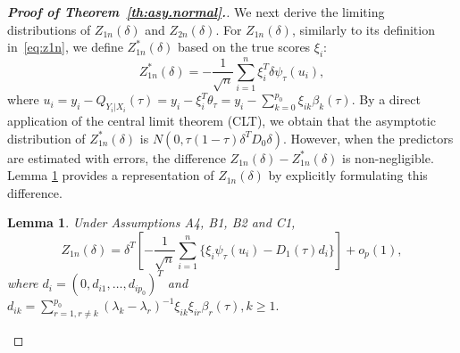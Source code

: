 \documentclass[times,sort&compress,3p]{elsarticle}
\theoremstyle{plain}%
\newtheorem{lemma}{Lemma}
\theoremstyle{definition}
\newcommand{\bD}{{D}}
\newcommand{\btheta}{{\theta}}
\newcommand{\bxi}{{\xi}}
\begin{document}
\begin{proof}[\textbf{\upshape Proof of Theorem~\ref{th:asy.normal}.}]
We next derive the limiting distributions of $Z_{1n}({\delta})$ and $Z_{2n}({\delta})$. For $Z_{1n}({\delta})$, similarly to its definition in~\eqref{eq:z1n}, we   
define $Z_{1n}^{*}({\delta})$ based on the true scores $\bxi_{i}$: 
\begin{equation}
\label{eq:z1n.star}
Z_{1n}^*({\delta}) = -\frac{1}{\sqrt{n}} \sum_{i = 1}^n \bxi_{i}^T {\delta} \psi_\tau({u}_i),
\end{equation}
where $u_ i = y_i - Q_{Y_i|X_i}(\tau) =  y_i - \bxi_{i}^T \btheta_{\tau} = y_i - \sum_{k = 0}^{p_0} \xi_{ik} \beta_k(\tau)$. 
By a direct application of the central limit theorem (CLT), we obtain that the asymptotic distribution of $Z_{1n}^*({\delta})$ is $N(0, \tau (1 - \tau) \delta^T D_0 \delta )$. However, when the predictors are estimated with errors, the difference $Z_{1n}({\delta}) - Z_{1n}^*({\delta})$ is non-negligible. Lemma \ref{th:z1n.represent} provides a representation of $Z_{1n}({\delta})$ by explicitly formulating this difference.
\begin{lemma}
	\label{th:z1n.represent}
	Under Assumptions A4, B1, B2 and C1, 
	\begin{equation}
	Z_{1n}({\delta}) = {\delta}^T \left[-\frac{1}{\sqrt{n}} \sum_{i = 1}^n \{ \bxi_{i} \psi_\tau({u}_i) - \bD_1(\tau) d_i \} \right] + o_p(1), 
	\end{equation}
	where ${d}_i = (0, d_{i1}, \ldots, d_{i p_0})^T$ and $d_{ik} = \sum_{r = 1, r \neq k}^{p_0} (\lambda_k - \lambda_r)^{-1} \xi_{ik} \xi_{ir} \beta_{r}(\tau), k \geq 1.$ 
\end{lemma}


\end{proof}
\end{document}
